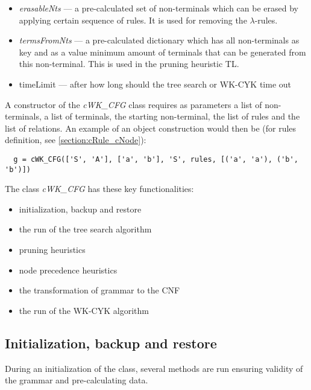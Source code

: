 \begin{itemize}
  \item{\textit{erasableNts} --- a pre-calculated set of non-terminals which can be erased by applying certain sequence of rules. It is used for removing the $\lambda$-rules.}

  \item{\textit{termsFromNts} --- a pre-calculated dictionary which has all non-terminals as key and as a value minimum amount of terminals that can be generated from this non-terminal. This is used in the pruning heuristic TL.}

  \item{timeLimit --- after how long should the tree search or WK-CYK time out}
\end{itemize}

A constructor of the \textit{cWK\_CFG} class requires as parameters a list of non-terminals, a list of terminals, the starting non-terminal, the list of rules and the list of relations. An example of an object construction would then be (for rules definition, see \ref{section:cRule_cNode}):
\begin{verbatim}
  g = cWK_CFG(['S', 'A'], ['a', 'b'], 'S', rules, [('a', 'a'), ('b', 'b')])
\end{verbatim}

\bigskip
The class \textit{cWK\_CFG} has these key functionalities:
\begin{itemize}
  \item{initialization, backup and restore}
  \item{the run of the tree search algorithm}
  \item{pruning heuristics}
  \item{node precedence heuristics}
  \item{the transformation of grammar to the CNF}
  \item{the run of the WK-CYK algorithm}
\end{itemize}

\subsection{Initialization, backup and restore}
During an initialization of the class, several methods are run ensuring validity of the grammar and pre-calculating data.

